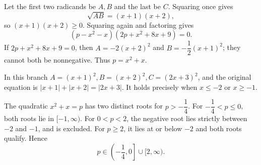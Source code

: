 Let the first two radicands be $A,B$ and the last be $C$. Squaring once gives
\[
\sqrt{AB}=(x+1)(x+2),
\]
so $(x+1)(x+2)\ge0$. Squaring again and factoring gives
\[
(p-x^2-x)(2p+x^2+8x+9)=0.
\]
If $2p+x^2+8x+9=0$, then $A=-2(x+2)^2$ and $B=-\dfrac{1}{2}(x+1)^2$; they cannot both be nonnegative. Thus $p=x^2+x$.

In this branch $A=(x+1)^2,B=(x+2)^2,C=(2x+3)^2$, and the original equation is
$|x+1|+|x+2|=|2x+3|$. It holds precisely when $x\le-2$ or $x\ge-1$.

The quadratic $x^2+x=p$ has two distinct roots for $p>-\dfrac{1}{4}$. For $-\dfrac{1}{4}<p\le0$, both roots lie in $[-1,\infty)$. For $0<p<2$, the negative root lies strictly between $-2$ and $-1$, and is excluded. For $p\ge2$, it lies at or below $-2$ and both roots qualify. Hence
\[
\boxed{p\in\left(-\dfrac{1}{4},0\right]\cup[2,\infty)}.
\]
